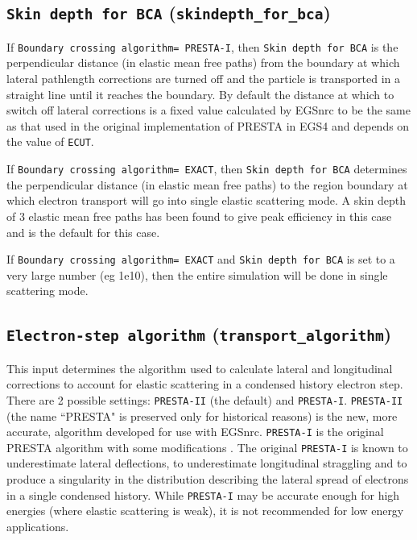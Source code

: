 \documentclass[12pt,twoside]{article}      %
\begin{document}
\subsection{{\tt  Skin depth for BCA} ({\tt skindepth\_for\_bca})}
\label{skindepthsect}

If {\tt Boundary crossing algorithm= PRESTA-I}, then
{\tt Skin depth for BCA} is the perpendicular distance
(in elastic mean free paths) from the boundary
at which lateral pathlength corrections are turned off and the particle
is transported in a straight line until it reaches the boundary.
By default the distance at which to switch off
lateral corrections is a fixed value calculated by EGSnrc to be
the same as that used in the original implementation of PRESTA in EGS4 and
depends on the value of {\tt ECUT}.

If {\tt Boundary crossing algorithm= EXACT}, then {\tt  Skin depth for BCA}
determines the perpendicular distance (in elastic mean
free paths) to the region boundary
at which electron transport will go into
single elastic scattering mode.  A skin depth of 3 elastic mean free
paths has been found to give peak efficiency in this case and is the
default for this case.

If {\tt Boundary crossing algorithm= EXACT} and
{\tt  Skin depth for BCA} is set to a very large number (eg 1e10),
then the entire simulation will be done in single scattering mode.


\subsection{{\tt Electron-step algorithm} ({\tt transport\_algorithm})}
\label{essect}

This input determines the algorithm used to calculate lateral and
longitudinal corrections to account for elastic scattering in a condensed
history electron step.  There
are 2 possible settings: {\tt PRESTA-II} (the default) and
{\tt PRESTA-I}.  {\tt PRESTA-II} (the name ``PRESTA" is preserved only
for historical reasons) is the new, more accurate, algorithm developed for
use with EGSnrc\cite{KR00}.  {\tt PRESTA-I} is the original
PRESTA algorithm with some modifications
\cite{BR87,Le50}.  The original {\tt PRESTA-I} is
known to underestimate lateral deflections, to underestimate longitudinal
straggling and to produce a singularity in the distribution describing
the lateral spread of electrons in a single condensed history.
While {\tt PRESTA-I} may be accurate enough for high energies
(where elastic scattering is weak), it is not recommended for low
energy applications.
\end{document}

